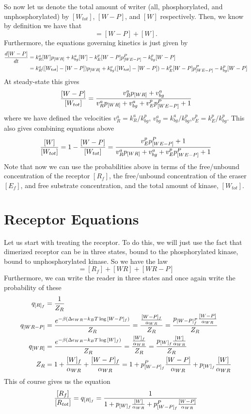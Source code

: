 \documentclass[preprint,onecolumn,amsmath]{revtex4-1}
\def\be{\begin{equation}}
\def\ee{\end{equation}}
\begin{document}
So now let us denote the total amount of writer (all, phosphorylated, and unphosphorylated) by  $[W_{tot}]$, $[W-P]$, and $[W]$ respectively.
Then, we know by definition we have that
\be
[W_{tot}] = [W-P] + [W].
\ee
Furthermore, the equations governing kinetics is just given by
\begin{align}
{d [W-P] \over dt} &= k_R^a [W] p_{[WR]}  + k_{bg}^a [W] - k_E^p [W-P]p_{[WE-P]}^P - k_{bg}^p [W-P] \\
&= k_R^a ([W_{tot}] - [W-P] )p_{[WR]}  + k_{bg}^a ([W_{tot}] -[W-P]) - k_E^p [W-P]p_{[WE-P]}^P - k_{bg}^p [W-P] 
\end{align}
At steady-state this gives
\be
{ [W-P] \over [W_{tot}] } ={ v_R^a p_{[WR]} + v_{bg}^a \over   v_R^a  p_{[WR]} + v_{bg}^a + v_E^p p_{[WE-P]}^P +1}
\ee
where we have defined the velocities $v_R^a = k_R^a/k_{bg}^p$, $v_{bg}^a = k_{bg}^a/k_{bg}^p$,$v_E^p = k_E^p/k_{bg}^p$.
This also gives combining equations above
\be
{ [W] \over [W_{tot}] }= 1- { [W-P] \over [W_{tot}] } = {v_E^p p_{[WE-P]}^P +1 \over  v_R^a  p_{[WR]} + v_{bg}^a + v_E^p p_{[WE-P]}^P +1}
\ee
Note that now we can use the probabilities above in terms of the free/unbound concentration of the receptor $[R_f]$, 
the free/unbound concentration of the eraser $[E_f]$, and free substrate concentration, and the total amount of kinase, $[W_{tot}]$.



\section{Receptor Equations}
Let us start with treating the receptor. To do this, we will just use the fact that dimerized 
receptor can be in three states, bound to the phosphorylated kinase, bound to unphosphorylated kinase. So we have the law
\be
[R_{tot}]= [R_f]+[WR]+[WR-P]
\ee
Furthermore, we can write the reader in three states and once again write the probability of these
\begin{align}
q_{[R]_f} &= {1 \over Z_{R}} \\
q_{[WR-P]} &= {e^{-\beta (\Delta \epsilon_{WR} -k_B T \log{[W-P]_f})}  \over Z_{R}} ={ {[W-P]_f \over \alpha_{WR}} \over Z_R}=
{ p_{[W-P]_f^P} {[W-P] \over \alpha_{WR}} \over Z_R} \\
q_{[WR]} &= {e^{-\beta (\Delta \epsilon_{WR} -k_B T \log{[W]_f})}  \over Z_{R}} ={ {[W]_f \over \alpha_{WR}} \over Z_R}=
{ p_{[W]_f} {[W] \over \alpha_{WR}} \over Z_R}\\
Z_R  &= 1+  {[W]_f \over \alpha_{WR}}+ {[W-P]_f \over \alpha_{WR}}=1+   p_{[W-P]_f}^P {[W-P] \over \alpha_{WR}}+ p_{[W]_f} {[W] \over
 \alpha_{WR}} 
\end{align} 
This of course gives us the equation
\be
{ [R_f] \over [R_{tot}]} = q_{[R]_f}={1 \over 1+   p_{[W]_f} {[W] \over \alpha_{WR}}+ p_{[W-P]_f}^P {[W-P] \over \alpha_{WR}}}
\ee
\end{document}
